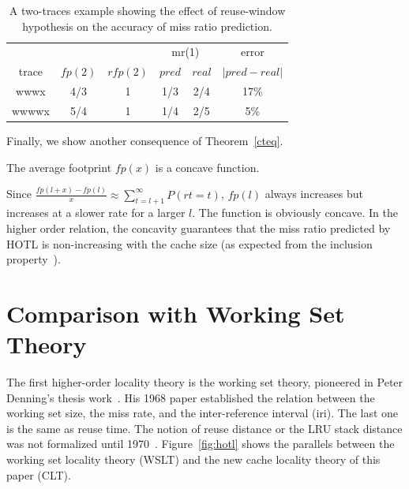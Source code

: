 \begin{table}
\centering
\begin{tabular}{|c|c|c|c|c|c|}
\hline
    & & & \multicolumn{2}{|c|}{mr(1)} & error \\ \cline{4-5}
trace & $fp(2)$ & $rfp(2)$ & $pred$ & $real$ & $\lvert pred-real \rvert$ \\ \hline
wwwx & 4/3 & 1 & 1/3 & 2/4 & 17\%\\ \hline
wwwwx & 5/4 & 1 & 1/4 & 2/5 & 5\% \\ \hline
\end{tabular} 
\caption{A two-traces example showing the effect of reuse-window
  hypothesis on the accuracy of miss ratio prediction.}
\label{tbl:filmer-eg2}
\end{table}

\medskip

Finally, we show another consequence of Theorem~\ref{cteq}.

\begin{corollary}[Concavity] The average footprint $fp(x)$ is a
  concave function.
\label{concavity}
\end{corollary}

Since $\frac{fp(l+x) - fp(l) }{x} \approx \sum_{t=l+1}^{\infty}
P(rt=t)$, $fp(l)$ always increases but increases at a slower rate for
a larger $l$.  The function is obviously concave.  In the higher order
relation, the concavity guarantees that the miss ratio predicted by
HOTL is non-increasing with the cache size (as expected from the
inclusion property~\cite{Mattson+:IBM70}). 

\section{Comparison with Working Set Theory}
\label{sec:Denning}

The first higher-order locality theory is the working set theory,
pioneered in Peter Denning's thesis work~\cite{Denning:CACM68}.  His
1968 paper established the relation between the working set size, the
miss rate, and the inter-reference interval (iri).  The last one is
the same as reuse time.  The notion of reuse distance or the LRU
stack distance was not formalized until 1970~\cite{Mattson+:IBM70}. 
Figure~\ref{fig:hotl} shows the parallels between the working set locality theory (WSLT) 
and the new cache locality theory of this paper (CLT).

